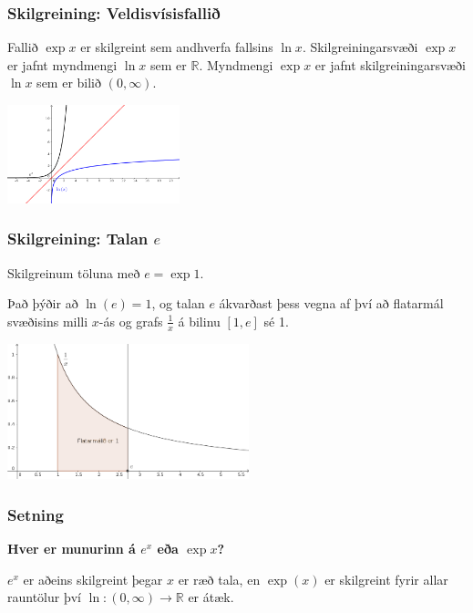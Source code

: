 \documentclass[icelandic,a4paper,12pt]{article}
\newcommand{\R}{{\mathbb  R}}
\begin{document}
\pause

\subsubsection{Skilgreining: Veldisvísisfallið}
Fallið $\exp x$ er skilgreint sem andhverfa fallsins $\ln x$.
\pause
Skilgreiningarsvæði  $\exp x$ er jafnt myndmengi $\ln x$ sem er $\R$.
\pause
Myndmengi $\exp x$ er jafnt skilgreiningarsvæði $\ln x$ sem er bilið
$(0,\infty)$.  

\begin{center}
\includegraphics[width=5cm,keepaspectratio=true]{./myndir/kafli04/02_ln-exp.png}
\end{center}

\subsubsection{Skilgreining: Talan $e$}
Skilgreinum töluna með $e=\exp 1$. 

\pause

Það þýðir að $\ln(e)=1$, \pause og talan $e$ 
ákvarðast þess vegna af því að flatarmál svæðisins milli $x$-ás og
grafs $\frac 1x$ á bilinu $[1,e]$ sé 1.
 
\begin{center}
 \includegraphics[width=7cm,keepaspectratio=true]{./myndir/kafli04/02_ln-e.png}
\end{center}



 \subsubsection{Setning}
\textbf{Hver er munurinn á $e^x$ eða $\exp x$?}

$e^x$ er aðeins skilgreint þegar $x$ er ræð tala, en $\exp(x)$ er skilgreint 
fyrir allar rauntölur því $\ln:(0,\infty)\to \R$ er átæk.
\end{document}
